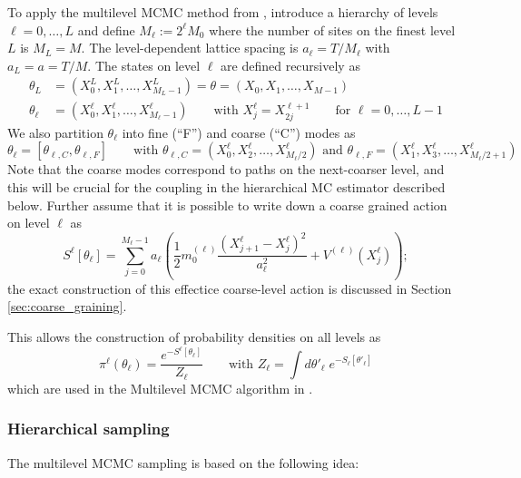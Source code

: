 \documentclass[11pt]{article}
\begin{document}
To apply the multilevel MCMC method from \cite{Dodwell2015}, introduce a hierarchy of levels $\ell=0,\dots,L$ and define $M_\ell:=2^\ell M_0$ where the number of sites on the finest level $L$ is $M_L = M$. The level-dependent lattice spacing is $a_\ell = T/M_\ell$ with $a_L=a=T/M$. The states on level $\ell$ are defined recursively as
\begin{equation}
  \begin{aligned}
    \theta_L &= (X^L_0,X^L_1,\dots,X^L_{M_L-1}) = \theta = (X_0,X_1,\dots,X_{M-1})\\
    \theta_\ell & = (X_0^\ell,X_1^\ell,\dots,X^\ell_{M_\ell-1})\qquad\text{with $X^{\ell}_j = X_{2j}^{\ell+1}$}\qquad\text{for $\ell=0,\dots,L-1$}
  \end{aligned}
\end{equation}
We also partition $\theta_\ell$ into fine (``F'') and  coarse (``C'') modes as
\begin{equation}
  \theta_\ell = [\theta_{\ell,C},\theta_{\ell,F}]\qquad\text{with $\theta_{\ell,C}=(X_0^\ell,X_2^\ell,\dots,X^\ell_{M_{\ell}/2})$ and $\theta_{\ell,F}=(X_1^\ell,X_3^\ell,\dots,X^\ell_{M_{\ell}/2+1})$}
\end{equation}
Note that the coarse modes correspond to paths on the next-coarser level, and this will be crucial for the coupling in the hierarchical MC estimator described below.
Further assume that it is possible to write down a coarse grained action on level $\ell$ as
\begin{equation}
  S^\ell[\theta_\ell] = \sum_{j=0}^{M_\ell-1} a_\ell \left(\frac{1}{2}m^{(\ell)}_0\frac{(X^\ell_{j+1}-X^\ell_{j})^2}{a_\ell^2}+  V^{(\ell)}\left(X_j^\ell\right)\right);\label{eqn:MultilevelCoarseAction}
\end{equation}
the exact construction of this effectice coarse-level action is discussed in Section \ref{sec:coarse_graining}.

This allows the construction of probability densities on all levels as
\begin{equation}
  \pi^\ell(\theta_\ell) = \frac{e^{-S^\ell[\theta_\ell]}}{Z_\ell}\qquad\text{with $Z_\ell=\int d\theta'_\ell\;e^{-S_\ell[\theta'_\ell]}$}
\end{equation}
which are used in the Multilevel MCMC algorithm in \cite{Dodwell2015}.
\subsubsection{Hierarchical sampling}
The multilevel MCMC sampling is based on the following idea:
\end{document}
